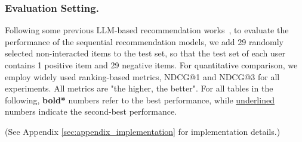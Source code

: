 \subsubsection{\textbf{Evaluation Setting.}} Following some previous LLM-based recommendation works~\cite{10.1145/3708882,kim2024large}, to evaluate the performance of the sequential recommendation models, we add 29 randomly selected non-interacted items to the test set, so that the test set of each user contains 1 positive item and 29 negative items. For quantitative comparison, we employ 
widely used ranking-based metrics, NDCG@1 and NDCG@3 for all experiments. All metrics are "the higher, the better". For all tables in the following, \textbf{bold*} numbers refer to the best performance, while \underline{underlined} numbers indicate the second-best performance.

\noindent(See Appendix \ref{sec:appendix_implementation} for implementation details.)

